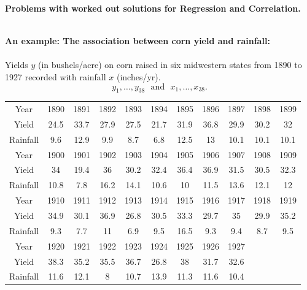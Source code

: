 \documentclass{report}
\begin{document}
\setlength{\topmargin}{0pt}
\setlength{\oddsidemargin}{0pt}

\newpage
{}

\begin{center}\Huge\textbf{Problems with worked out solutions for Regression and Correlation.}\\
\normalsize \end{center}
\large ~\hrulefill
~\\
\textbf{An example: The association between corn yield and rainfall:}\\~\\
Yields $y$ (in bushels/acre) on corn raised in six midwestern states from 1890 to 1927 recorded with rainfall $x$ (inches/yr). \\
$$ y_1,\ldots,y_{38} \ \ \ \mbox{and} \ \ \  x_1,\ldots,x_{38}.$$
\begin{center}
\begin{tabular}{|c|cccccccccc|} \hline
Year & 1890 & 1891 & 1892 & 1893 & 1894 & 1895 & 1896 & 1897 & 1898 & 1899 \\
Yield  & 24.5 & 33.7 & 27.9 & 27.5 & 21.7 & 31.9 & 36.8 & 29.9 & 30.2 & 32\\
Rainfall & 9.6 & 12.9 & 9.9 & 8.7 & 6.8 & 12.5 & 13 & 10.1 & 10.1 & 10.1  \\  \hline
Year & 1900 & 1901 & 1902 & 1903 & 1904 & 1905 & 1906 & 1907 & 1908 & 1909 \\
Yield  & 34 & 19.4 & 36 & 30.2 & 32.4 & 36.4 & 36.9 & 31.5 & 30.5 & 32.3\\
Rainfall & 10.8 & 7.8 & 16.2 & 14.1 & 10.6 & 10 & 11.5 & 13.6 & 12.1 & 12 \\ \hline
Year & 1910 & 1911 & 1912 & 1913 & 1914 & 1915 & 1916 & 1917 & 1918 & 1919 \\
Yield & 34.9 & 30.1 & 36.9 & 26.8 & 30.5 & 33.3 & 29.7 & 35 & 29.9 & 35.2\\
Rainfall & 9.3 & 7.7 & 11 & 6.9 & 9.5 & 16.5 & 9.3 & 9.4 & 8.7 & 9.5 \\ \hline
Year & 1920 & 1921 & 1922 & 1923 & 1924 & 1925 & 1926 & 1927 & &\\
Yield & 38.3 & 35.2 & 35.5 & 36.7 & 26.8 & 38 & 31.7 & 32.6 & &\\
Rainfall & 11.6 & 12.1 & 8 & 10.7 & 13.9 & 11.3 & 11.6 & 10.4 & &\\ \hline
\end{tabular}
\end{center}
\end{document}
